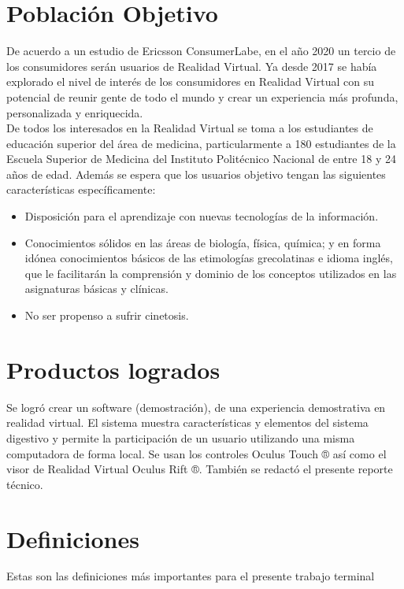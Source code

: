 \section{Población Objetivo}
De acuerdo a un estudio de Ericsson ConsumerLabe\cite{web3}, en el año 2020 un tercio de los consumidores serán usuarios de Realidad Virtual. Ya desde 2017 se había
explorado el nivel de interés de los consumidores en Realidad Virtual\cite{web4} con su potencial de reunir gente de todo el mundo y crear un experiencia más profunda,
personalizada y enriquecida.\\
\newline
De todos los interesados en la Realidad Virtual se toma a los estudiantes de educación superior del área de medicina, particularmente a 180\cite{ofi1}  estudiantes de
 la Escuela Superior de Medicina del Instituto Politécnico Nacional de entre 18 y 24 años de edad. Además se espera que los usuarios objetivo tengan las siguientes 
 características\cite{web5} específicamente:\\
\newline
\begin{itemize}
\item Disposición para el aprendizaje con nuevas tecnologías de la información.
\item Conocimientos sólidos en las áreas de biología, física, química; y en forma idónea conocimientos básicos de las etimologías grecolatinas e idioma inglés, que le 
facilitarán la comprensión y dominio de los conceptos utilizados en las asignaturas básicas y clínicas.
\item No ser propenso a sufrir cinetosis.
\end{itemize}

\section{Productos logrados}
Se logró crear un software (demostración), de una experiencia demostrativa en realidad virtual. El sistema muestra características y elementos del sistema digestivo y 
permite la participación de un usuario utilizando una misma computadora de forma local. Se usan los controles Oculus Touch ® así como el visor de Realidad Virtual Oculus 
Rift ®. También se redactó el presente reporte técnico.

\section{Definiciones}
Estas son las definiciones más importantes para el presente trabajo terminal

